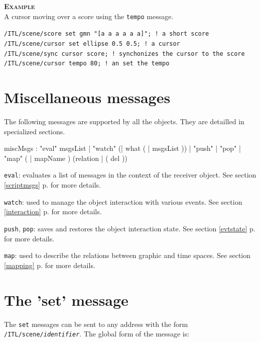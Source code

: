 \documentclass[a4paper,twoside]{report}
\newcommand{\toplevel}[1]	{\chapter{#1}}
\newcommand{\fullref}[1]	{\ref{#1} p.\pageref{#1}}
\newcommand{\OSC}[1]		{\texttt{#1}}
\newcommand{\example}		{\textbf{\hspace{-1.5cm}\textbf{\textsc{Example }}}}
\let\olditemize\itemize
\let\oldenditemize\enditemize
\renewenvironment{itemize} 	{\olditemize \setlength{\itemsep}{1mm}}{\oldenditemize}
\newcommand{\sample}	[1]			{\vspace{-2mm}\begin{center}\colorbox{mygrey}{
								\begin{minipage}[t]{0.9\columnwidth} 
								{\small \texttt{#1}}
								\end{minipage}}\end{center}}
\begin{document}
\example \\
A cursor moving over a score using the \OSC{tempo} message.
\sample{/ITL/scene/score set gmn "[a a a a a a]"; 	\hspace{3mm} ! a short score \\
/ITL/scene/cursor set ellipse 0.5 0.5;   			\hspace{7.5mm} ! a cursor \\
/ITL/scene/sync cursor score;   					\hspace{22mm} ! synchonizes the cursor to the score \\
/ITL/scene/cursor tempo 80; 						\hspace{25.5mm} ! an set the tempo
}


\toplevel{Miscellaneous messages}
\label{miscmsgs}

The following messages are supported by all the objects. They are detailled in specialized sections.

\begin{rail}
miscMsgs :  
		 	"eval" msgsList
		|   "watch" (| what ( | msgsList ))
		| 	"push"
		| 	"pop"
		| 	"map" ( | mapName ) (relation | ( del ))
\end{rail}

\begin{itemize}
\item \OSC{eval}: evaluates a list of messages in the context of the receiver object. See section \fullref{scriptmsgs} for more details.
\item \OSC{watch}: used to manage the object interaction with various events. See section \fullref{interaction} for more details.
\item \OSC{push}, \OSC{pop}: saves and restores the object interaction state. See section \fullref{evtstate} for more details.
\item \OSC{map}: used to describe the relations between graphic and time spaces. See section \fullref{mapping} for more details.
\end{itemize}



\toplevel{The 'set' message}
\label{setsect}
The \OSC{set} messages can be sent to any address with the form \OSC{/ITL/scene/\textit{identifier}}. The global form of the message is:
\end{document}
